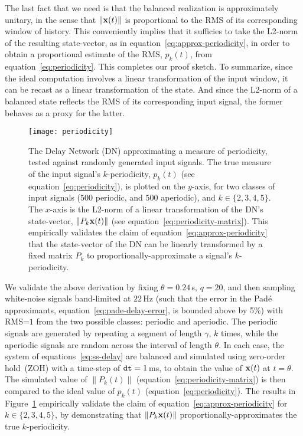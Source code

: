 The last fact that we need is that the balanced realization is approximately unitary, in the sense that $\| \mathbf{x}(t) \|$ is proportional to the RMS of its corresponding window of history.
This conveniently implies that it sufficies to take the L2-norm of the resulting state-vector, as in equation~\ref{eq:approx-periodicity}, in order to obtain a proportional estimate of the RMS, $p_k(t)$, from equation~\ref{eq:periodicity}.
This completes our proof sketch.
To summarize, since the ideal computation involves a linear transformation of the input window, it can be recast as a linear transformation of the state.
And since the L2-norm of a balanced state reflects the RMS of its corresponding input signal, the former behaves as a proxy for the latter.

\begin{figure}
  \centering
  \texttt{[image: periodicity]}
  \caption{\label{fig:periodicity}
    The Delay Network (DN) approximating a measure of periodicity, tested against  randomly generated input signals.
    The true measure of the input signal's $k$-periodicity, $p_k(t)$ (see equation~\ref{eq:periodicity}), is plotted on the $y$-axis, for two classes of input signals ($500$ periodic, and $500$ aperiodic), and $k \in \{2, 3, 4, 5\}$.
    The $x$-axis is the L2-norm of a linear transformation of the DN's state-vector, $\| P_k \mathbf{x}(t) \|$ (see equation~\ref{eq:periodicity-matrix}).
    This empirically validates the claim of equation~\ref{eq:approx-periodicity} that the state-vector of the DN can be linearly transformed by a fixed matrix $P_k$ to proportionally-approximate a signal's $k$-periodicity.
  }
\end{figure}

We validate the above derivation by fixing $\theta=0.24$\,s, $q=20$, and then sampling white-noise signals band-limited at $22$\,Hz (such that the error in the Pad\'e approximants, equation~\ref{eq:pade-delay-error}, is bounded above by 5\%) with RMS=$1$ from the two possible classes: periodic and aperiodic.
The periodic signals are generated by repeating a segment of length $\gamma$, $k$ times, while the aperiodic signals are random across the interval of length $\theta$.
In each case, the system of equations~\ref{eq:ss-delay} are balanced and simulated using zero-order hold~(ZOH) with a time-step of $\texttt{dt}{} = 1$\,ms, to obtain the value of $\mathbf{x}(t)$ at $t = \theta$.
The simulated value of $\| P_k(t) \|$ (equation~\ref{eq:periodicity-matrix}) is then compared to the ideal value of $p_k(t)$ (equation~\ref{eq:periodicity}).
The results in Figure~\ref{fig:periodicity} empirically validate the claim of equation~\ref{eq:approx-periodicity} for $k \in \{2, 3, 4, 5\}$, by demonstrating that $\|P_k \mathbf{x}(t) \|$ proportionally-approximates the true $k$-periodicity.

